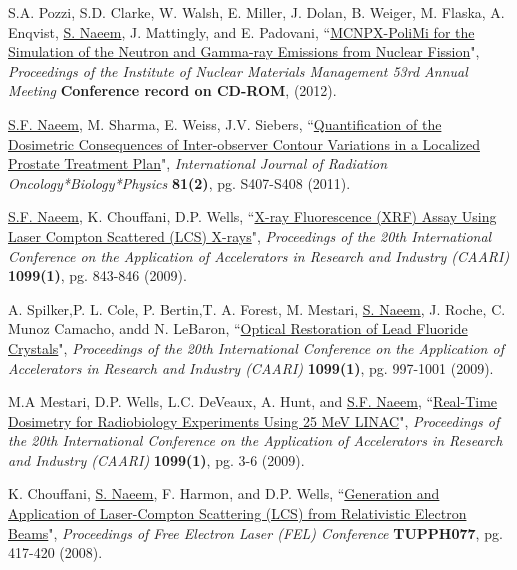 \documentclass[paper=letter,fontsize=11pt]{scrartcl} %
\newcommand{\PaperEntry}[7]{
		\noindent #1, ``\href{#7}{#2}", \textit{#3} \textbf{#4}, #5 (#6).}
\begin{document}
\begin{etaremune}
\item \PaperEntry{S.A. Pozzi, S.D. Clarke, W. Walsh, E. Miller, J. Dolan, B. Weiger, M. Flaska, A. Enqvist, \underline{S. Naeem}, J. Mattingly, and E. Padovani}{MCNPX-PoliMi for the Simulation of the Neutron and Gamma-ray Emissions from Nuclear Fission}{Proceedings of the Institute of Nuclear Materials Management 53rd Annual Meeting} {Conference record on CD-ROM}{}{2012}
{}

\item \PaperEntry{\underline{S.F. Naeem}, M. Sharma, E. Weiss, J.V. Siebers}{Quantification of the Dosimetric Consequences of Inter-observer Contour Variations in a Localized Prostate Treatment Plan}{International Journal of Radiation Oncology*Biology*Physics}{81(2)}{pg. S407-S408}{2011}
{}

\item \PaperEntry{\underline{S.F. Naeem}, K. Chouffani, D.P. Wells}{X-ray Fluorescence (XRF) Assay Using Laser Compton Scattered (LCS) X-rays}{Proceedings of the 20th International Conference on the Application of Accelerators in Research and Industry (CAARI)}{1099(1)}{pg. 843-846}{2009}
{http://dx.doi.org/10.1063/1.3120170}

\item \PaperEntry{A. Spilker,P. L. Cole, P. Bertin,T. A. Forest, M. Mestari, \underline{S. Naeem}, J. Roche,  C. Munoz Camacho, andd N. LeBaron}{Optical Restoration of Lead Fluoride Crystals}{Proceedings of the 20th International Conference on the Application of Accelerators in Research and Industry (CAARI)}{1099(1)}{pg. 997-1001}{2009}
{http://dx.doi.org/10.1063/1.3120211}

\item \PaperEntry{M.A Mestari, D.P. Wells, L.C. DeVeaux, A. Hunt, and \underline{S.F. Naeem}}{Real-Time Dosimetry for Radiobiology Experiments Using 25 MeV LINAC}{Proceedings of the 20th International Conference on the Application of Accelerators in Research and Industry (CAARI)}{1099(1)}{pg. 3-6}{2009}
{http://dx.doi.org/10.1063/1.3120062}

\item \PaperEntry{K. Chouffani, \underline{S. Naeem}, F. Harmon, and D.P. Wells}{Generation and Application of Laser-Compton Scattering (LCS) from Relativistic Electron Beams}{ Proceedings of Free Electron Laser (FEL) Conference}{TUPPH077}{pg. 417-420}{2008}
{http://accelconf.web.cern.ch/accelconf/fel2008/papers/tupph077.pdf}

\end{etaremune}
\end{document}

